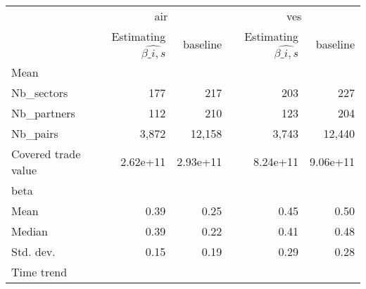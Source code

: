 \begin{tabular}{lllll}
\cline{1-5}
\multicolumn{1}{c}{} &
  \multicolumn{2}{|c}{air} &
  \multicolumn{2}{c}{ves} \\
\multicolumn{1}{c}{} &
  \multicolumn{1}{|r}{Estimating $\widehat{\beta\_{i,s}}$} &
  \multicolumn{1}{r}{baseline} &
  \multicolumn{1}{r}{Estimating $\widehat{\beta\_{i,s}}$} &
  \multicolumn{1}{r}{baseline} \\
\cline{1-5}
\multicolumn{1}{l}{Mean} &
  \multicolumn{1}{|r}{} &
  \multicolumn{1}{r}{} &
  \multicolumn{1}{r}{} &
  \multicolumn{1}{r}{} \\
\multicolumn{1}{l}{\hspace{1em}Nb\_sectors} &
  \multicolumn{1}{|r}{177} &
  \multicolumn{1}{r}{217} &
  \multicolumn{1}{r}{203} &
  \multicolumn{1}{r}{227} \\
\multicolumn{1}{l}{\hspace{1em}Nb\_partners} &
  \multicolumn{1}{|r}{112} &
  \multicolumn{1}{r}{210} &
  \multicolumn{1}{r}{123} &
  \multicolumn{1}{r}{204} \\
\multicolumn{1}{l}{\hspace{1em}Nb\_pairs} &
  \multicolumn{1}{|r}{3,872} &
  \multicolumn{1}{r}{12,158} &
  \multicolumn{1}{r}{3,743} &
  \multicolumn{1}{r}{12,440} \\
\multicolumn{1}{l}{\hspace{1em}Covered trade value} &
  \multicolumn{1}{|r}{2.62e+11} &
  \multicolumn{1}{r}{2.93e+11} &
  \multicolumn{1}{r}{8.24e+11} &
  \multicolumn{1}{r}{9.06e+11} \\
\multicolumn{1}{l}{beta} &
  \multicolumn{1}{|r}{} &
  \multicolumn{1}{r}{} &
  \multicolumn{1}{r}{} &
  \multicolumn{1}{r}{} \\
\multicolumn{1}{l}{\hspace{1em}Mean} &
  \multicolumn{1}{|r}{0.39} &
  \multicolumn{1}{r}{0.25} &
  \multicolumn{1}{r}{0.45} &
  \multicolumn{1}{r}{0.50} \\
\multicolumn{1}{l}{\hspace{1em}Median} &
  \multicolumn{1}{|r}{0.39} &
  \multicolumn{1}{r}{0.22} &
  \multicolumn{1}{r}{0.41} &
  \multicolumn{1}{r}{0.48} \\
\multicolumn{1}{l}{\hspace{1em}Std. dev.} &
  \multicolumn{1}{|r}{0.15} &
  \multicolumn{1}{r}{0.19} &
  \multicolumn{1}{r}{0.29} &
  \multicolumn{1}{r}{0.28} \\
\multicolumn{1}{l}{Time trend} &
  \multicolumn{1}{|r}{} &
  \multicolumn{1}{r}{} &
  \multicolumn{1}{r}{} &

\end{tabular}
